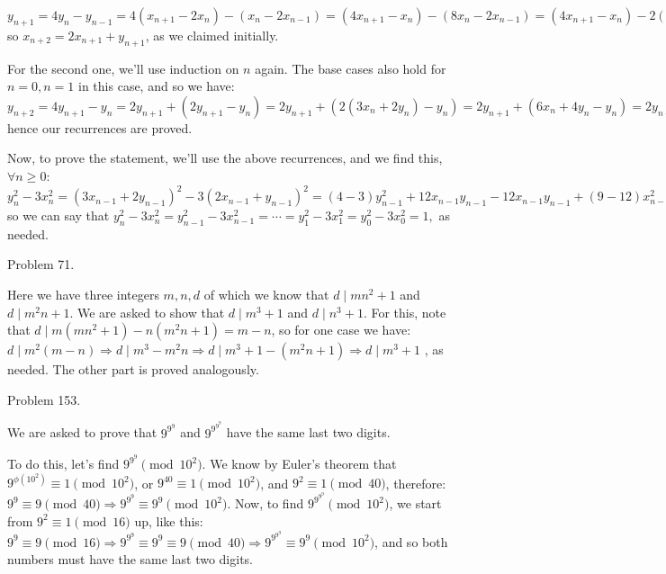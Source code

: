 \documentclass[12pt]{minimal}
\begin{document}
	$
		y_{n + 1} = 4y_n - y_{n - 1} = 
		4(x_{n + 1} - 2x_n) - (x_n - 2x_{n - 1}) =
		(4x_{n + 1} - x_n) - (8x_n - 2x_{n - 1}) =
		(4x_{n + 1} - x_n) - 2(4x_n - x_{n - 1}) =
		x_{n + 2} - 2x_{n + 1},
	$
	so $x_{n + 2} = 2x_{n + 1} + y_{n + 1}$, as we claimed
	initially.

	For the second one, we'll use induction on $n$ again. The
	base cases also hold for $n = 0, n = 1$ in this case, and
	so we have:
	$
		y_{n + 2} = 4y_{n + 1} - y_n = 
	    2y_{n + 1} + (2y_{n + 1} - y_n) =
		2y_{n + 1} + (2(3x_n + 2y_n) - y_n) =
		2y_{n + 1} + (6x_n + 4y_n - y_n) =
		2y_{n + 1} + 3(2x_n + y_n) =
		2y_{n + 1} + 3x_{n + 1},
	$
	hence our recurrences are proved.

	Now, to prove the statement, we'll use the above
	recurrences, and we find this, $\forall n \geq 0$:
	$
		y_n^2 - 3x_n^2 =
		(3x_{n - 1} + 2y_{n - 1})^2 - 3(2x_{n - 1} + y_{n - 1})^2 =
		(4 - 3)y_{n - 1}^2 + 12 x_{n - 1} y_{n - 1} -
		12 x_{n - 1} y_{n - 1} + (9 - 12)x_{n - 1}^2 =
		y_{n - 1}^2 - 3x_{n - 1}^2,
	$
	so we can say that
	$
		y_n^2 - 3x_n^2 = y_{n - 1}^2 - 3x_{n - 1}^2 =
		\cdots = y_1^2 - 3x_1^2 = y_0^2 - 3x_0^2 = 1,
	$
	as needed.

	Problem 71.

	Here we have three integers $m, n, d$ of which we
	know that $d \mid mn^2 + 1$ and $d \mid m^2n + 1$. We
	are asked to show that $d \mid m^3 + 1$ and
	$d \mid n^3 + 1$. For this, note that
	$d \mid m(mn^2 + 1) - n(m^2n + 1) = m - n$,
	so for one case we have:
	$
		d \mid m^2(m - n) \Rightarrow
		d \mid m^3 - m^2n \Rightarrow
		d \mid m^3 + 1 - (m^2n + 1) \Rightarrow
		d \mid m^3 + 1
	$
	, as needed. The other part is proved analogously.

	Problem 153.

	We are asked to prove that $9^{9^9}$ and $9^{9^{9^9}}$
	have the same last two digits.

	To do this, let's find $9^{9^9} \pmod {10^2}$.
	We know by Euler's theorem that
	$9^{\phi(10^2)} \equiv 1 \pmod {10^2}$, or
	$9^{40} \equiv 1 \pmod{10^2}$, and
	$9^2 \equiv 1 \pmod {40}$, therefore:
	$
		9^9 \equiv 9 \pmod{40} \Rightarrow
		9^{9^9} \equiv 9^9 \pmod{10^2}
	$.
	Now, to find $9^{9^{9^9}} \pmod{10^2}$, we start
	from $9^2 \equiv 1 \pmod{16}$ up, like this:
	$
		9^9 \equiv 9 \pmod{16} \Rightarrow
		9^{9^9} \equiv 9^9 \equiv 9 \pmod{40} \Rightarrow
		9^{9^{9^9}} \equiv 9^9 \pmod{10^2}
	$, and so both numbers must have the same last two
	digits.
\end{document}
